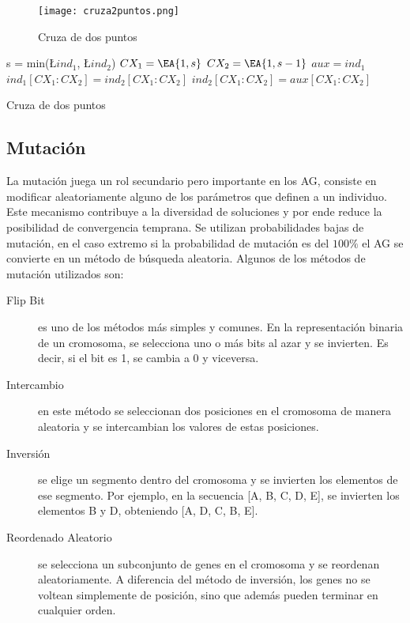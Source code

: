 \begin{figure}[h!]
  \centering
  \texttt{[image: cruza2puntos.png]}
  \caption{Cruza de dos puntos~\parencite{wirsansky}}\label{fig:cr2puntos}
\end{figure}


\begin{algorithm}[h!]
  \BlankLine
  s = min(\L{$ind_{1}$}, \L {$ind_{2}$})\;
  $CX_{1} = \EA{1, s}$\;
  $CX_{2} = \EA{1, s-1}$\;
  $aux = ind_{1}$\;
  $ind_{1}[CX_{1}:CX_{2}] = ind_{2}[CX_{1}:CX_{2}]$\;
  $ind_{2}[CX_{1}:CX_{2}] = aux[CX_{1}:CX_{2}]$\;
  \;
  \caption{Cruza de dos puntos}\label{algo:cr2puntos}
\end{algorithm}

\subsection{Mutación}
%
La mutación juega un rol secundario pero importante en los AG, consiste en
modificar aleatoriamente alguno de los parámetros que definen a un individuo.
%
Este mecanismo contribuye a la diversidad de soluciones y por ende reduce la posibilidad de
convergencia temprana.
%
Se utilizan probabilidades bajas de mutación, en el caso extremo si la
probabilidad de mutación es del $100\%$ el AG se convierte en un método de
búsqueda aleatoria.
%
Algunos de los métodos de mutación utilizados son:

\begin{description}
  \item [Flip Bit] es uno de los métodos más simples y comunes. En la
representación binaria de un cromosoma, se selecciona uno o más bits al azar y
se invierten. Es decir, si el bit es 1, se cambia a 0 y viceversa.
  \item [Intercambio] en este método se seleccionan dos posiciones en el
cromosoma de manera aleatoria y se intercambian los valores de estas posiciones.
  \item [Inversión] se elige un segmento dentro del cromosoma y se invierten los
elementos de ese segmento. Por ejemplo, en la secuencia [A, B, C, D, E],
se invierten los elementos B y D, obteniendo [A, D, C, B, E].
  \item [Reordenado Aleatorio] se selecciona un subconjunto de genes en el
cromosoma y se reordenan aleatoriamente. A diferencia del método de inversión,
los genes no se voltean simplemente de posición, sino que además pueden terminar
en cualquier orden.
\end{description}

